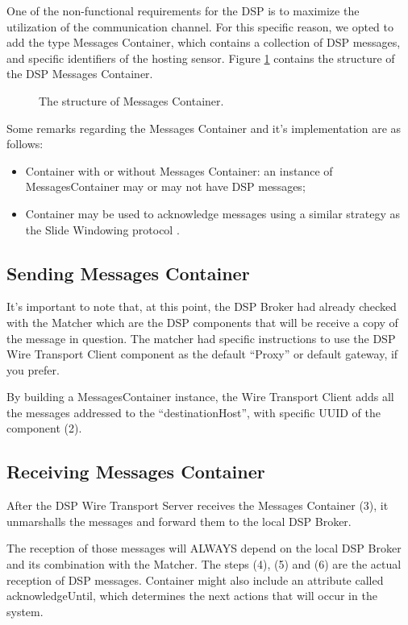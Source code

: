 \documentclass[conference]{IEEEtran}
\begin{document}
One of the non-functional requirements for the DSP is to maximize the
utilization of the communication channel. For this specific reason, we opted to
add the type Messages Container, which contains a collection of DSP messages,
and specific identifiers of the hosting sensor. Figure
\ref{FIG_DSP_MSGS_CONTAINER} contains the structure of the DSP Messages
Container.

\begin{figure}[!htb]
\centering
{}
\caption{\label{FIG_DSP_MSGS_CONTAINER} The structure of Messages Container.}
\end{figure}

Some remarks regarding the Messages Container and it's implementation are as
follows:

\begin{itemize}
  \item Container with or without Messages Container: an instance of
  MessagesContainer may or may not have DSP messages;
  \item Container may be used to acknowledge messages using a similar strategy
  as the Slide Windowing protocol \cite{slide-window}. 
\end{itemize}

\subsection{Sending Messages Container}

It's important to note that, at this point, the DSP Broker had already checked
with the Matcher which are the DSP components that will be receive a copy of
the message in question. The matcher had specific instructions to use the DSP
Wire Transport Client component as the default ``Proxy'' or default gateway, if
you prefer.

By building a MessagesContainer instance, the Wire Transport Client adds all
the messages addressed to the ``destinationHost'', with specific UUID of
the component (2).

\subsection{Receiving Messages Container}

After the DSP Wire Transport Server receives the Messages Container (3), it
unmarshalls the messages and forward them to the local DSP Broker. 

The reception of those messages will ALWAYS depend on the local DSP Broker and
its combination with the Matcher. The steps (4), (5) and (6) are the
actual reception of DSP messages. Container might also include an attribute
called acknowledgeUntil, which determines the next actions that will occur in the system.
\end{document}
